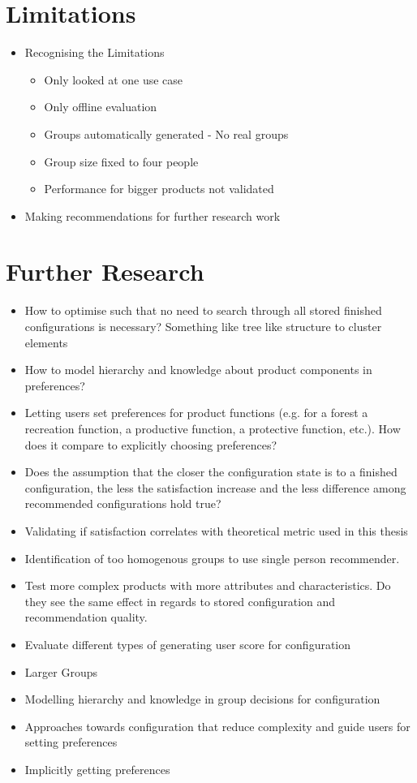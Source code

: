 \section{Limitations}
\label{sec:Conclusion:Limitations}
\begin{itemize}
    \item Recognising the Limitations
        \begin{itemize}
            \item Only looked at one use case
            \item Only offline evaluation
            \item Groups automatically generated - No real groups
            \item Group size fixed to four people
            \item Performance for bigger products not validated
        \end{itemize}
    \item Making recommendations for further research work 
\end{itemize}

\section{Further Research}
\label{sec:Conclusion:PossibleExtensions}

\begin{itemize}
    \item How to optimise such that no need to search through all stored finished configurations is necessary? Something like tree like structure to cluster elements
    \item How to model hierarchy and knowledge about product components in preferences?
    \item Letting users set preferences for product functions (e.g. for a forest a recreation function, a productive function, a protective function, etc.). How does it compare to explicitly choosing preferences?
    \item Does the assumption that the closer the configuration state is to a finished configuration, the less the satisfaction increase and the less difference among recommended configurations hold true?
    \item Validating if satisfaction correlates with theoretical metric used in this thesis
    \item Identification of too homogenous groups to use single person recommender.
    \item Test more complex products with more attributes and characteristics. Do they see the same effect in regards to stored configuration and recommendation quality.
    \item Evaluate different types of generating user score for configuration
    \item Larger Groups
    \item Modelling hierarchy and knowledge in group decisions for configuration
    \item Approaches towards configuration that reduce complexity and guide users for setting preferences
    \item Implicitly getting preferences
\end{itemize}
